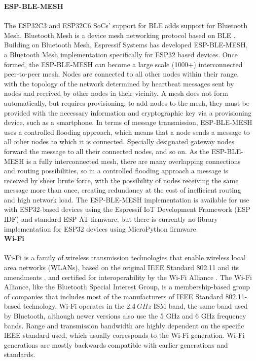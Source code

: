 \textbf{ESP-BLE-MESH}\\\\
The ESP32C3 and ESP32C6 SoCs' support for BLE adds support for Bluetooth Mesh. Bluetooth Mesh is a device mesh networking protocol based on BLE \citep{noauthor_bluetooth_2023, noauthor_bluetooth_2023-1}. Building on Bluetooth Mesh, Espressif Systems has developed ESP-BLE-MESH, a Bluetooth Mesh implementation specifically for ESP32 based devices.
Once formed, the ESP-BLE-MESH can become a large scale (1000+) interconnected peer-to-peer mesh. Nodes are connected to all other nodes within their range, with the topology of the network determined by heartbeat messages sent by nodes and received by other nodes in their vicinity. A mesh does not form automatically, but requires provisioning: to add nodes to the mesh, they must be provided with the necessary information and cryptographic key via a provisioning device, such as a smartphone.  
In terms of message transmission, ESP-BLE-MESH uses a controlled flooding approach, which means that a node sends a message to all other nodes to which it is connected. Specially designated gateway nodes forward the message to all their connected nodes, and so on. As the ESP-BLE-MESH is a fully interconnected mesh, there are many overlapping connections and routing possibilities, so in a controlled flooding approach a message is received by sheer brute force, with the possibility of nodes receiving the same message more than once, creating redundancy at the cost of inefficient routing and high network load. The ESP-BLE-MESH implementation is available for use with ESP32-based devices using the Espressif IoT Development Framework (ESP IDF) and standard ESP AT firmware, but there is currently no library implementation for ESP32 devices using MicroPython firmware. \citep{espressif_systems_esp-ble-mesh_nodate, noauthor_bluetooth_2023, noauthor_bluetooth_2023-1}\\

\textbf{Wi-Fi}\\\\
Wi-Fi is a family of wireless transmission technologies that enable wireless local area networks (WLANs), based on the original IEEE Standard 802.11 and its amendments \citep[][]{noauthor_ieee_2024}, and certified for interoperability by the Wi-Fi Alliance \citep{noauthor_certification_2020}. The Wi-Fi Alliance, like the Bluetooth Special Interest Group, is a membership-based group of companies that includes most of the manufacturers of IEEE Standard 802.11-based technology. \citep{noauthor_wi-fi_nodate} Wi-Fi operates in the $2.4\ GHz$ ISM band, the same band used by Bluetooth, although newer versions also use the 5 GHz and 6 GHz frequency bands. Range and transmission bandwidth are highly dependent on the specific IEEE standard used, which usually corresponds to the Wi-Fi generation. Wi-Fi generations are mostly backwards compatible with earlier generations and standards.

